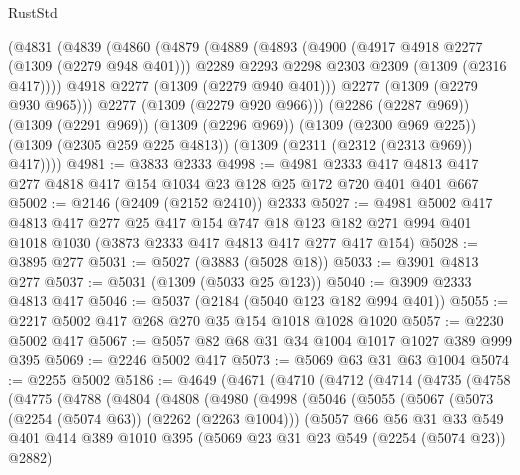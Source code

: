 \begin{lexlean}{RustStd}
\begin{coremodule}
    (@4831
      (@4839
        (@4860
          (@4879
            (@4889
              (@4893
                (@4900
                  (@4917 @4918 @2277 (@1309 (@2279 @948 @401)))
                  @2289
                  @2293
                  @2298
                  @2303
                  @2309
                  (@1309 (@2316 @417))))
              @4918
              @2277
              (@1309 (@2279 @940 @401)))
            @2277
            (@1309 (@2279 @930 @965)))
          @2277
          (@1309 (@2279 @920 @966)))
        (@2286 (@2287 @969))
        (@1309 (@2291 @969))
        (@1309 (@2296 @969))
        (@1309 (@2300 @969 @225))
        (@1309 (@2305 @259 @225 @4813))
        (@1309 (@2311 (@2312 (@2313 @969)) @417))))
@4981 := @3833 @2333
@4998 := @4981
    @2333
    @417
    @4813
    @417
    @277
    @4818
    @417
    @154
    @1034
    @23
    @128
    @25
    @172
    @720
    @401
    @401
    @667
@5002 := @2146 (@2409 (@2152 @2410)) @2333
@5027 := @4981
    @5002
    @417
    @4813
    @417
    @277
    @25
    @417
    @154
    @747
    @18
    @123
    @182
    @271
    @994
    @401
    @1018
    @1030
    (@3873 @2333 @417 @4813 @417 @277 @417 @154)
@5028 := @3895 @277
@5031 := @5027 (@3883 (@5028 @18))
@5033 := @3901 @4813 @277
@5037 := @5031 (@1309 (@5033 @25 @123))
@5040 := @3909 @2333 @4813 @417
@5046 := @5037 (@2184 (@5040 @123 @182 @994 @401))
@5055 := @2217 @5002 @417 @268 @270 @35 @154 @1018 @1028 @1020
@5057 := @2230 @5002 @417
@5067 := @5057 @82 @68 @31 @34 @1004 @1017 @1027 @389 @999 @395
@5069 := @2246 @5002 @417
@5073 := @5069 @63 @31 @63 @1004
@5074 := @2255 @5002
@5186 := @4649
    (@4671
      (@4710
        (@4712
          (@4714
            (@4735
              (@4758
                (@4775
                  (@4788
                    (@4804
                      (@4808
                        (@4980
                          (@4998
                            (@5046
                              (@5055
                                (@5067
                                  (@5073 (@2254 (@5074 @63)) (@2262 (@2263 @1004)))
                                  (@5057
                                    @66
                                    @56
                                    @31
                                    @33
                                    @549
                                    @401
                                    @414
                                    @389
                                    @1010
                                    @395
                                    (@5069 @23 @31 @23 @549 (@2254 (@5074 @23)) @2882)

\end{coremodule}
\end{lexlean}
